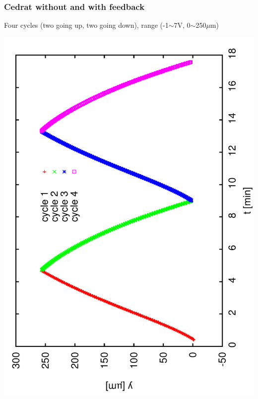 \documentclass[a4paper,11pt]{book}
\begin{document}
\subsubsection{Cedrat without and with feedback}
Four cycles (two going up, two going down), range (-1$\sim$7V, 0$\sim$250$\mu$m)\par
\includegraphics[angle=-90,scale=0.15]{image31.pdf}
\end{document}
